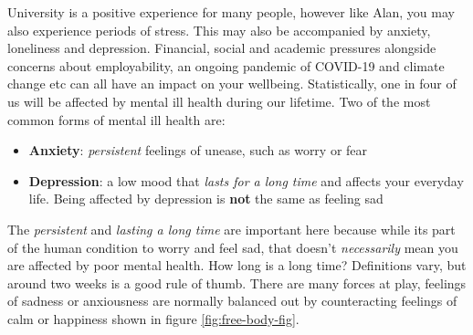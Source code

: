 \documentclass[
]{book}
\providecommand{\tightlist}{%
  \setlength{\itemsep}{0pt}\setlength{\parskip}{0pt}}
\begin{document}
University is a positive experience for many people, however like Alan, you may also experience periods of stress. This may also be accompanied by anxiety, loneliness and depression. Financial, social and academic pressures alongside concerns about employability, an ongoing pandemic of COVID-19 and climate change etc can all have an impact on your wellbeing. Statistically, one in four of us will be affected by mental ill health during our lifetime. Two of the most common forms of mental ill health are:

\begin{itemize}
\tightlist
\item
  \textbf{Anxiety}: \emph{persistent} feelings of unease, such as worry or fear
\item
  \textbf{Depression}: a low mood that \emph{lasts for a long time} and affects your everyday life. Being affected by depression is \textbf{not} the same as feeling sad
\end{itemize}

The \emph{persistent} and \emph{lasting a long time} are important here because while its part of the human condition to worry and feel sad, that doesn't \emph{necessarily} mean you are affected by poor mental health. How long is a long time? Definitions vary, but around two weeks is a good rule of thumb. There are many forces at play, feelings of sadness or anxiousness are normally balanced out by counteracting feelings of calm or happiness shown in figure \ref{fig:free-body-fig}.
\end{document}
